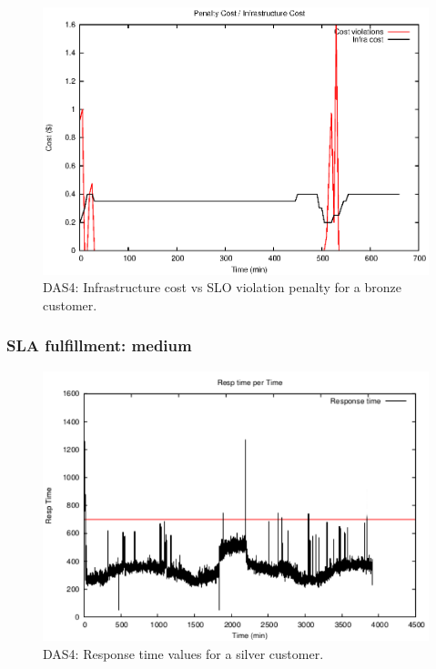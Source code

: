 \begin{figure}
  \begin{center}
    \includegraphics[width=.85\linewidth]{images/exps2011/low/das/penaltyVScost.eps}
  \end{center}
\vspace{-5mm}
  \caption{DAS4: Infrastructure cost vs SLO violation penalty for a bronze customer.}
  \label{lowPenalty}
\end{figure}

\subsubsection{SLA fulfillment: medium}

\begin{figure}
  \begin{center}
    \includegraphics[width=.85\linewidth]{images/exps2011/medium/das/proxyDataPoints_output.pdf}
  \end{center}
\vspace{-5mm}
  \caption{DAS4: Response time values for a silver customer.}
  \label{mediumResponseTime}
\end{figure}

